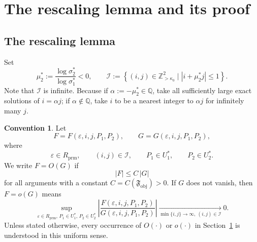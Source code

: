 \documentclass[11pt,a4paper]{article}
\theoremstyle{plain}
\theoremstyle{definition}
\newtheorem{convention}[theorem]{Convention}
\theoremstyle{plain}
\numberwithin{equation}{section}
\begin{document}
\section{The rescaling lemma and its proof}
\label{sec-rescaling}

\subsection{The rescaling lemma}

Set
\[
\mu_2^* := \frac{\log \sigma_2^*}{\log \sigma_1^*} < 0,
\qquad
\mathcal{I} := \left\{ (i,j) \in \mathbb{Z}_{>\kappa_0}^2 \mid |i + \mu_2^* j| \le 1 \right\}.
\]
Note that $\mathcal{I}$ is infinite. Because if $\alpha := -\mu_2^* \in \mathbb{Q}$, take all sufficiently large exact solutions of $i = \alpha j$; if $\alpha \notin \mathbb{Q}$, take $i$ to be a nearest integer to $\alpha j$ for infinitely many $j$.

\begin{convention}
\label{not-bigO}
Let
\[
F = F(\varepsilon,i,j,P_1,P_2),
\qquad
G = G(\varepsilon,i,j,P_1,P_2),
\]
where
\[
\varepsilon \in R_\mathrm{prm},
\qquad
(i,j) \in \mathcal{I},
\qquad
P_1 \in U_1^*,
\qquad
P_2 \in U_2^*.
\]
We write $F = O(G)$ if
\[
|F| \le C\,|G|
\]
for all arguments with a constant $C = C(\mathfrak{F}_\mathrm{obj}) > 0$. If $G$ does not vanish, then $F = o(G)$ means
\[
\sup_{\varepsilon \in R_\mathrm{prm},\, P_1 \in U_1^*,\, P_2 \in U_2^*}
\left| \frac{F(\varepsilon,i,j,P_1,P_2)}{G(\varepsilon,i,j,P_1,P_2)} \right|
\xrightarrow[\min\{i,j\}\to\infty,\ (i,j)\in\mathcal{I}]{} 0.
\]
Unless stated otherwise, every occurrence of $O(\cdot)$ or $o(\cdot)$ in Section~\ref{sec-rescaling} is understood in this uniform sense.
\end{convention}
\end{document}
